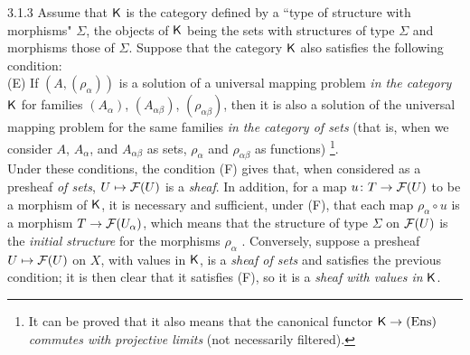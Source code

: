 \documentclass[../main.tex]{subfiles}
\begin{document}
\begin{env}{3.1.3}
Assume that $\mathsf{K}$ is the category defined by a ``type of structure
with morphisms" $\Sigma$, the objects of $\mathsf{K}$ being the sets with structures
of type $\Sigma$ and morphisms those of $\Sigma$. Suppose that the category $\mathsf{K}$ also satisfies
the following condition:\\

(E) If $(A,(\rho_\alpha))$ is a solution of a universal mapping problem \emph{in the category} $\mathsf{K}$
for families $(A_\alpha)$, $(A_{\alpha\beta})$, $(\rho_{\alpha\beta})$, then it is also a solution of the
universal mapping problem for the same families \emph{in the category of sets} (that is, when we
consider $A$, $A_\alpha$, and $A_{\alpha\beta}$ as sets, $\rho_\alpha$ and $\rho_{\alpha\beta}$ as functions)
\footnote{It can be proved that it also means that the canonical functor $\mathsf{K}\to(\mathrm{Ens})$
\emph{commutes with projective limits} (not necessarily filtered).}.\\

Under these conditions, the condition (F) gives that, when considered as a presheaf
\emph{of sets}, $U\mapsto\mathcal{F}(U)$ is a \emph{sheaf}. In addition, for a map $u\colon T\to\mathcal{F}(U)$
to be a morphism of $\mathsf{K}$, it is necessary and sufficient, under (F), that each map $\rho_\alpha\circ u$
is a morphism $T\to\mathcal{F}(U_\alpha)$, which means that the structure of type $\Sigma$ on $\mathcal{F}(U)$
is the \emph{initial structure} for the morphisms $\rho_\alpha$ . Conversely, suppose a presheaf
$U\mapsto\mathcal{F}(U)$ on $X$, with values in $\mathsf{K}$, is a \emph{sheaf of sets} and satisfies the previous
condition; it is then clear that it satisfies (F), so it is a \emph{sheaf with values in} $\mathsf{K}$.
\end{env}
\end{document}
